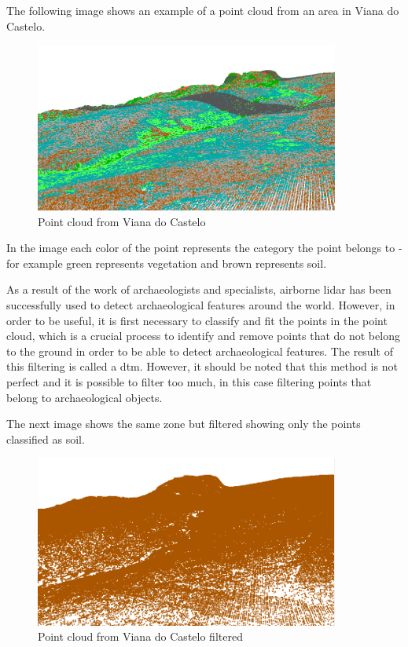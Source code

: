 The following image shows an example of a point cloud from an area in Viana do Castelo.

\begin{figure}[H]
\centering
\includegraphics[width=10cm]{images/pointcloudViana.png}
\caption{Point cloud from Viana do Castelo}
\end{figure}

In the image each color of the point represents the category the point belongs to - for example green represents vegetation and brown represents soil.

As a result of the work of archaeologists and specialists, airborne lidar has been successfully used to detect archaeological features around the world. However, in order to be useful, it is first necessary to classify and fit the points in the point cloud, which is a crucial process to identify and remove points that do not belong to the ground in order to be able to detect archaeological features. The result of this filtering is called a \ac{dtm}. However, it should be noted that this method is not perfect and it is possible to filter too much, in this case filtering points that belong to archaeological objects.

The next image shows the same zone but filtered showing only the points classified as soil.
\begin{figure}[H]
\centering
\includegraphics[width=10cm]{images/pointcloudVianafiltrado.png}
\caption{Point cloud from Viana do Castelo filtered}
\end{figure}

